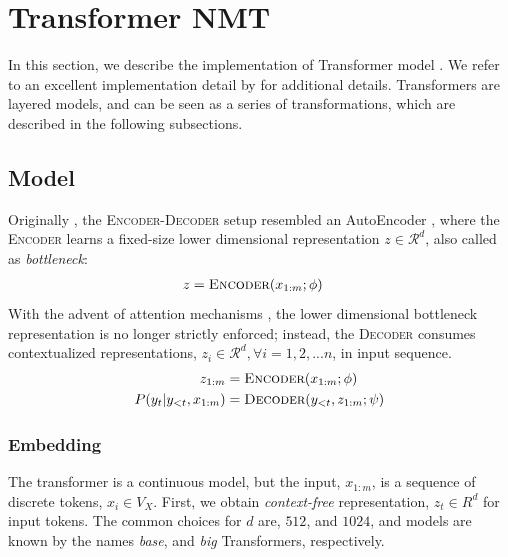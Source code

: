 \chapter{Transformer NMT}



In this section, we describe the implementation of Transformer model \cite{vaswani-2017-attention}. 
We refer to an excellent implementation detail by \citet{rush-2018-annotated} for additional details.
Transformers are layered models, and can be seen as a series of transformations, which are described in the following subsections.

\section{Model}

Originally \cite{sutskever2014seq2seq,cho-etal-2014-properties}, the \textsc{Encoder-Decoder} setup resembled an AutoEncoder \cite{rumelhart1985learning}, where the \textsc{Encoder} learns a fixed-size lower dimensional representation $z \in \mathcal{R}^d$, also called as \textit{bottleneck}:
\begin{align*}
  z & = \textsc{Encoder}(x_{1:m}; \phi)
\end{align*}
With the advent of attention mechanisms \cite{bahdanau2014nmtattn,luong2015effectiveAttn,vaswani-2017-attention}, the lower dimensional bottleneck representation is no longer strictly enforced; instead, the \textsc{Decoder} consumes contextualized representations, $z_i \in \mathcal{R}^d, \forall i=1,2,...n $, in input sequence.
\begin{align*}
    z_{1:m} & = \textsc{Encoder}(x_{1:m}; \phi) \\
  P(y_t | y_{<t}, x_{1:m}) & = \textsc{Decoder}(y_{<t}, z_{1:m}; \psi)
\end{align*}

\subsection{Embedding}

The transformer is a continuous model, but the input, $x_{1:m}$, is a sequence of discrete tokens, $x_i \in V_X$.
First, we obtain \textit{context-free} representation, $z_t\in R^d$ for input tokens. The common choices for $d$ are, $512$, and $1024$, and models are known by the names \textit{base}, and \textit{big} Transformers, respectively. 

